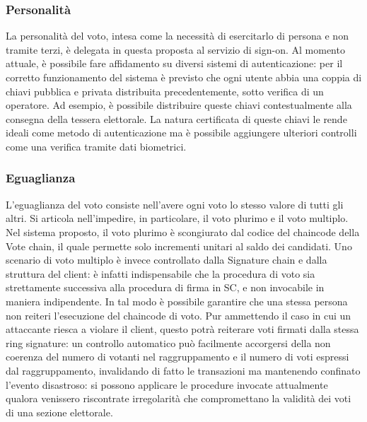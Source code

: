 		\subsubsection{Personalità}\label{subsec:personalita_voto}
			La personalità del voto, intesa come la necessità di esercitarlo di persona e non tramite terzi, è delegata in questa proposta al servizio di sign-on. Al momento attuale, è possibile fare affidamento su diversi sistemi di autenticazione: per il corretto funzionamento del sistema è previsto che ogni utente abbia una coppia di chiavi pubblica e privata distribuita precedentemente, sotto verifica di un operatore. Ad esempio, è possibile distribuire queste chiavi contestualmente alla consegna della tessera elettorale. La natura certificata di queste chiavi le rende ideali come metodo di autenticazione ma è possibile aggiungere ulteriori controlli come una verifica tramite dati biometrici.
		
		\subsubsection{Eguaglianza}
			L'eguaglianza del voto consiste nell'avere ogni voto lo stesso valore di tutti gli altri. Si articola nell'impedire, in particolare, il voto plurimo e il voto multiplo. Nel sistema proposto, il voto plurimo è scongiurato dal codice del chaincode della Vote chain, il quale permette solo incrementi unitari al saldo dei candidati. Uno scenario di voto multiplo è invece controllato dalla Signature chain e dalla struttura del client: è infatti indispensabile che la procedura di voto sia strettamente successiva alla procedura di firma in SC, e non invocabile in maniera indipendente. In tal modo è possibile garantire che una stessa persona non reiteri l'esecuzione del chaincode di voto. Pur ammettendo il caso in cui un attaccante riesca a violare il client, questo potrà reiterare voti firmati dalla stessa ring signature: un controllo automatico può facilmente accorgersi della non coerenza del numero di votanti nel raggruppamento e il numero di voti espressi dal raggruppamento, invalidando di fatto le transazioni ma mantenendo confinato l'evento disastroso: si possono applicare le procedure invocate attualmente qualora venissero riscontrate irregolarità che compromettano la validità dei voti di una sezione elettorale.
		
